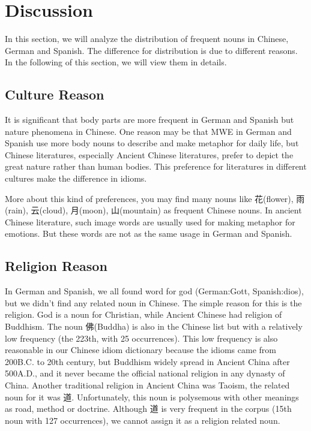 \section{Discussion}\label{discuss}

In this section, we will analyze the distribution of frequent nouns in Chinese, German and Spanish. The difference for distribution is due to different reasons. In the following of this section, we will view them in details. 

\subsection{Culture Reason}
It is significant that body parts are more frequent in German and Spanish but nature phenomena in Chinese. One reason may be that MWE in German and Spanish use more body nouns to describe and make metaphor for daily life, but Chinese literatures, especially Ancient Chinese literatures, prefer to depict the great nature rather than human bodies. This preference for literatures in different cultures make the difference in idioms. 

More about this kind of preferences, you may find many nouns like 花(flower), 雨(rain), 云(cloud), 月(moon), 山(mountain) as frequent Chinese nouns. In ancient Chinese literature, such image words are usually used for making metaphor for emotions. But these words are not as the same usage in German and Spanish. 

\subsection{Religion Reason}
In German and Spanish, we all found word for god (German:Gott, Spanish:dios), but we didn't find any related noun in Chinese. The simple reason for this is the religion. God is a noun for Christian, while Ancient Chinese had religion of Buddhism. The noun 佛(Buddha) is also in the Chinese list but with a relatively low frequency (the 223th, with 25 occurrences). This low frequency is also reasonable in our Chinese idiom dictionary because the idioms came from 200B.C. to 20th century, but Buddhism widely spread in Ancient China after 500A.D., and it never became the official national religion in any dynasty of China. Another traditional religion in Ancient China was Taoism, the related noun for it was 道. Unfortunately, this noun is polysemous with other meanings as road, method or doctrine. Although 道 is very frequent in the corpus (15th noun with 127 occurrences), we cannot assign it as a religion related noun. 

